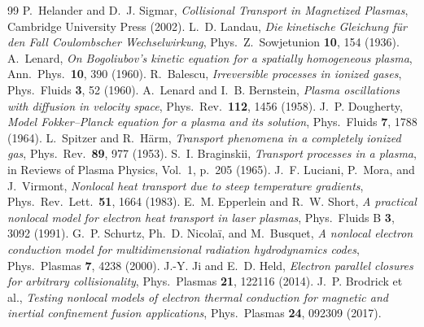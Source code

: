 \begin{thebibliography}{99}
P.~Helander and D.~J. Sigmar,
\emph{Collisional Transport in Magnetized Plasmas},
Cambridge University Press (2002).
L.~D. Landau,
\emph{Die kinetische Gleichung f\"ur den Fall Coulombscher Wechselwirkung},
Phys.\ Z.\ Sowjetunion \textbf{10}, 154 (1936).
A.~Lenard,
\emph{On Bogoliubov's kinetic equation for a spatially homogeneous plasma},
Ann.\ Phys.\ \textbf{10}, 390 (1960).
R.~Balescu,
\emph{Irreversible processes in ionized gases},
Phys.\ Fluids \textbf{3}, 52 (1960).
A.~Lenard and I.~B. Bernstein,
\emph{Plasma oscillations with diffusion in velocity space},
Phys.\ Rev.\ \textbf{112}, 1456 (1958).
J.~P. Dougherty,
\emph{Model Fokker--Planck equation for a plasma and its solution},
Phys.\ Fluids \textbf{7}, 1788 (1964).
L.~Spitzer and R.~H\"arm,
\emph{Transport phenomena in a completely ionized gas},
Phys.\ Rev.\ \textbf{89}, 977 (1953).
S.~I. Braginskii,
\emph{Transport processes in a plasma},
in Reviews of Plasma Physics, Vol.~1, p.~205 (1965).
J.~F. Luciani, P.~Mora, and J.~Virmont,
\emph{Nonlocal heat transport due to steep temperature gradients},
Phys.\ Rev.\ Lett.\ \textbf{51}, 1664 (1983).
E.~M. Epperlein and R.~W. Short,
\emph{A practical nonlocal model for electron heat transport in laser
plasmas},
Phys.\ Fluids B \textbf{3}, 3092 (1991).
G.~P. Schurtz, Ph.~D. Nicola\"i, and M.~Busquet,
\emph{A nonlocal electron conduction model for multidimensional radiation
hydrodynamics codes},
Phys.\ Plasmas \textbf{7}, 4238 (2000).
J.-Y. Ji and E.~D. Held,
\emph{Electron parallel closures for arbitrary collisionality},
Phys.\ Plasmas \textbf{21}, 122116 (2014).
J.~P. Brodrick et al.,
\emph{Testing nonlocal models of electron thermal conduction for magnetic
and inertial confinement fusion applications},
Phys.\ Plasmas \textbf{24}, 092309 (2017).


\end{thebibliography}
